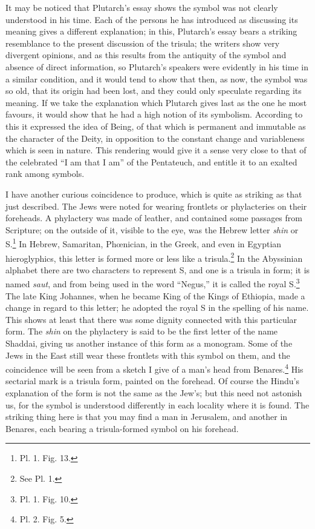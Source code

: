 \documentclass[a4paper, 11pt, oneside, english]{article}
\begin{document}
It may be noticed that Plutarch's essay shows the symbol was not clearly understood in his time. Each of the persons he has introduced as discussing its meaning gives a different explanation; in this, Plutarch's essay bears a striking resemblance to the present discussion of the trisula; the writers show very divergent opinions, and as this results from the antiquity of the symbol and absence of direct information, so Plutarch's speakers were evidently in his time in a similar condition, and it would tend to show that then, as now, the symbol was so old, that its origin had been lost, and they could only speculate regarding its meaning. If we take the explanation which Plutarch gives last as the one he most favours, it would show that he had a high notion of its symbolism. According to this it expressed the idea of Being, of that which is permanent and immutable as the character of the Deity, in opposition to the constant change and variableness which is seen in nature. This rendering would give it a sense very close to that of the celebrated ``I am that I am'' of the Pentateuch, and entitle it to an exalted rank among symbols.

I have another curious coincidence to produce, which is quite as striking as that just described. The Jews were noted for wearing frontlets or phylacteries on their foreheads. A phylactery was made of leather, and contained some passages from Scripture; on the outside of it, visible to the eye, was the Hebrew letter \emph{shin} or S.\footnote{Pl. 1. Fig. 13.} In Hebrew, Samaritan, Phœnician, in the Greek, and even in Egyptian hieroglyphics, this letter is formed more or less like a trisula.\footnote{See Pl. 1.} In the Abyssinian alphabet there are two characters to represent S, and one is a trisula in form; it is named \emph{saut}, and from being used in the word ``Negus,'' it is called the royal S.\footnote{Pl. 1. Fig. 10.} The late King Johannes, when he became King of the Kings of Ethiopia, made a change in regard to this letter; he adopted the royal S in the spelling of his name. This shows at least that there was some dignity connected with this particular form. The \emph{shin} on the phylactery is said to be the first letter of the name Shaddai, giving us another instance of this form as a monogram. Some of the Jews in the East still wear these frontlets with this symbol on them, and the coincidence will be seen from a sketch I give of a man's head from Benares.\footnote{Pl. 2. Fig. 5.} His sectarial mark is a trisula form, painted on the forehead. Of course the Hindu's explanation of the form is not the same as the Jew's; but this need not astonish us, for the symbol is understood differently in each locality where it is found. The striking thing here is that you may find a man in Jerusalem, and another in Benares, each bearing a trisula-formed symbol on his forehead.
\end{document}
